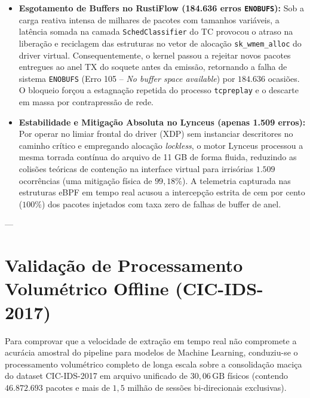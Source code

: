 \documentclass[11pt,a4paper]{article}
\begin{document}
\begin{itemize}
    \item \textbf{Esgotamento de Buffers no RustiFlow (184.636 erros \texttt{ENOBUFS}):} Sob a carga reativa intensa de milhares de pacotes com tamanhos variáveis, a latência somada na camada \texttt{SchedClassifier} do TC provocou o atraso na liberação e reciclagem das estruturas no vetor de alocação \texttt{sk\_wmem\_alloc} do driver virtual. Consequentemente, o kernel passou a rejeitar novos pacotes entregues ao anel TX do soquete antes da emissão, retornando a falha de sistema \texttt{ENOBUFS} (Erro 105 -- \textit{No buffer space available}) por $184.636$ ocasiões. O bloqueio forçou a estagnação repetida do processo \texttt{tcpreplay} e o descarte em massa por contrapressão de rede.
    \item \textbf{Estabilidade e Mitigação Absoluta no Lynceus (apenas 1.509 erros):} Por operar no limiar frontal do driver (XDP) sem instanciar descritores no caminho crítico e empregando alocação \textit{lockless}, o motor Lynceus processou a mesma torrada contínua do arquivo de 11 GB de forma fluida, reduzindo as colisões teóricas de contenção na interface virtual para irrisórias $1.509$ ocorrências (uma mitigação física de \textbf{$99,18\%$}). A telemetria capturada nas estruturas eBPF em tempo real acusou a intercepção estrita de cem por cento ($100\%$) dos pacotes injetados com taxa zero de falhas de buffer de anel.
\end{itemize}

---

\section{Validação de Processamento Volumétrico Offline (CIC-IDS-2017)}
Para comprovar que a velocidade de extração em tempo real não compromete a acurácia amostral do pipeline para modelos de Machine Learning, conduziu-se o processamento volumétrico completo de longa escala sobre a consolidação maciça do dataset CIC-IDS-2017 em arquivo unificado de $30,06\,\text{GB}$ físicos (contendo $46.872.693$ pacotes e mais de $1,5$ milhão de sessões bi-direcionais exclusivas).
\end{document}
